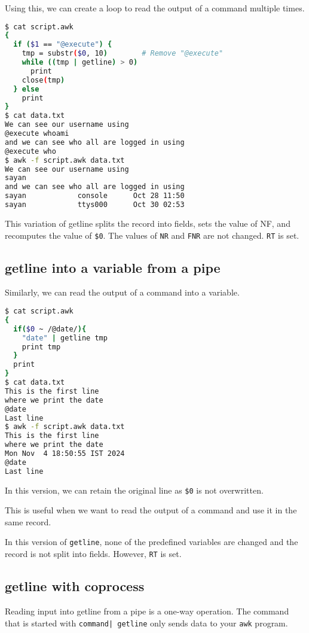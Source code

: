 Using this, we can create a loop to read the output of a command multiple times.

\begin{lstlisting}[language=bash]
$ cat script.awk
{
  if ($1 == "@execute") {
    tmp = substr($0, 10)        # Remove "@execute"
    while ((tmp | getline) > 0)
      print
    close(tmp)
  } else
    print
}
$ cat data.txt
We can see our username using
@execute whoami
and we can see who all are logged in using
@execute who
$ awk -f script.awk data.txt
We can see our username using
sayan
and we can see who all are logged in using
sayan            console      Oct 28 11:50 
sayan            ttys000      Oct 30 02:53 
\end{lstlisting}

This variation of getline splits the record into fields, sets the value of NF, and recomputes the value of \lstinline|$0|.
The values of \lstinline|NR| and \lstinline|FNR| are not changed. \lstinline|RT| is set.

\subsection{getline into a variable from a pipe}

Similarly, we can read the output of a command into a variable.

\begin{lstlisting}[language=bash]
$ cat script.awk
{
  if($0 ~ /@date/){
    "date" | getline tmp
    print tmp
  }
  print 
}
$ cat data.txt
This is the first line
where we print the date
@date
Last line
$ awk -f script.awk data.txt
This is the first line
where we print the date
Mon Nov  4 18:50:55 IST 2024
@date
Last line
\end{lstlisting}

In this version, we can retain the original line as \lstinline|$0| is not overwritten.

This is useful when we want to read the output of a command and use it in the same record.

In this version of \lstinline|getline|, none of the predefined variables are changed and the record is not split into fields. However, \lstinline|RT| is set.

\subsection{getline with coprocess}

Reading input into getline from a pipe is a one-way operation.
The command that is started with \lstinline:command| getline: only sends data to your \lstinline|awk| program.

